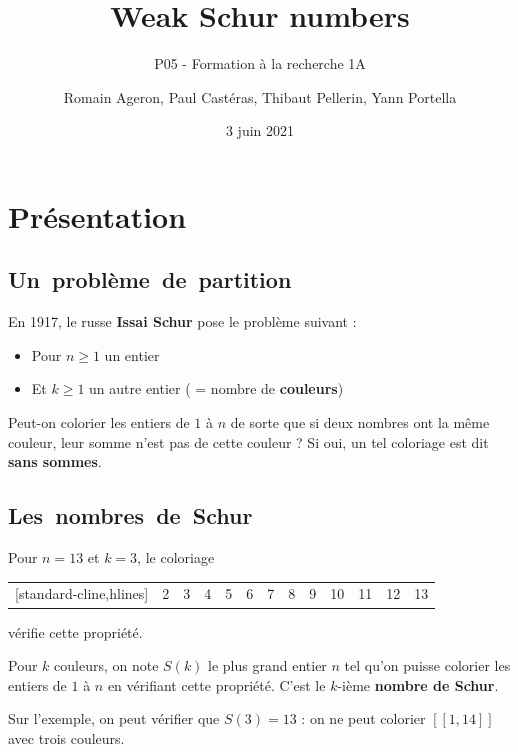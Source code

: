 \documentclass[graphics]{beamer}
\title[Weak Schur numbers]{Weak Schur numbers}
\subtitle{P05 - Formation à la recherche 1A}
\author[R. Ageron, P. Castéras, T. Pellerin, Y. Portella]{Romain Ageron, Paul Castéras, Thibaut Pellerin, Yann Portella}
\date{3 juin 2021}
\begin{document}
\begin{frame}
\titlepage
\end{frame}

\section{Présentation}
\subsection{Un~problème~de~partition}
\begin{frame}
	En 1917, le russe \textbf{Issai Schur} pose le problème suivant :
	\pause
	\begin{itemize}
		\item Pour \(n \geq 1\) un entier
		\item Et \(k \geq 1\) un autre entier ( = nombre de \textbf{couleurs})
	\end{itemize}
	\pause
	\begin{tcolorbox}[colback=green!5,colframe=green!40!black,title=Question]
		Peut-on colorier les entiers de \(1\) à \(n\) de sorte que si deux nombres ont la même couleur,
		leur somme n'est pas de cette couleur ? Si oui, un tel coloriage est dit \textbf{sans sommes}.
	\end{tcolorbox}
\end{frame}

\subsection{Les~nombres~de~Schur}

\begin{frame}
	Pour \(n = 13\) et \(k = 3\), le coloriage \\
	\begin{center}
	\begin{NiceTabular}{|*{13}{c|}}[standard-cline,hlines]
		\CodeBefore
		 & 2 & 3 & 4 & 5 & 6 & 7 & 8 & 9 & 10 & 11 & 12 & 13\\
	\end{NiceTabular}
	\end{center}
	vérifie cette propriété.
	\pause
	\begin{tcolorbox}[colback=red!5,colframe=red!40!black,title=Définition]
		Pour \(k\) couleurs, on note \(S(k)\) le plus grand entier \(n\) tel qu'on puisse colorier les entiers de
		\(1\) à \(n\) en vérifiant cette propriété. C'est le \(k\)-ième \textbf{nombre de Schur}.
	\end{tcolorbox}
	\pause
	Sur l'exemple, on peut vérifier que \(S(3) = 13\) : on ne peut colorier \([\![1,14]\!]\) avec trois couleurs.
\end{frame}
\end{document}
